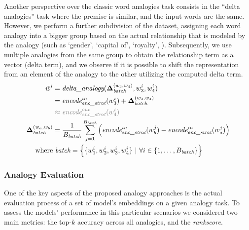 Another perspective over the classic word analogies task consists in the ``delta analogies'' task where the premise is similar, and the input words are the same.
However, we perform a further subdivision of the dataset, assigning each word analogy into a bigger group based on the actual relationship that is modeled by the analogy (such as `gender', `capital of', `royalty', ).
Subsequently, we use multiple analogies from the same group to obtain the relationship term as a vector (delta term), and we observe if it is possible to shift the representation from an element of the analogy to the other utilizing the computed delta term.
\begin{equation}
    \label{eq:method_embeddings_delta-analogy-function}
    \begin{aligned}
        \tilde{w}^i &= \textit{delta\_analogy}(\gbm{\Delta}_{\textit{batch}}^{(w_3, w_4)}, w_3^i, w_4^i) \\
        &= {\textit{encode}}_{\textit{enc\_strat}}^{in}(w_3^i) + \gbm{\Delta}_{\textit{batch}}^{(w_3, w_4)} \\
        &\color{gray} \approx {\textit{encode}}_{\textit{enc\_strat}}^{out}(w_4^i) \\
        \gbm{\Delta}_{\textit{batch}}^{(w_a, w_b)} &= \frac{1}{B_{\textit{batch}}}\sum_{j=1}^{B_{\textit{batch}}}{\Bigl({\textit{encode}}_{\textit{enc\_strat}}^{in}(w_b^j) - {\textit{encode}}_{\textit{enc\_strat}}^{in}(w_a^j)\Bigr)} \\
        \text{where}&\ \textit{batch} = \Bigl\{ \{w_1^i, w_2^i, w_3^i, w_4^i\} \ |\ \forall i \in \{1,\ldots, B_{\textit{batch}}\} \Bigr\}
    \end{aligned}
\end{equation}

\subsubsection{Analogy Evaluation}\label{subsubsec:method_embeddings_evaluation}

One of the key aspects of the proposed analogy approaches is the actual evaluation process of a set of model's embeddings on a given analogy task.
To assess the models' performance in this particular scenarios we considered two main metrics: the top-$k$ accuracy across all analogies, and the \emph{rankscore}.

